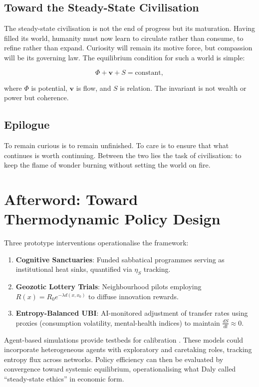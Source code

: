 \documentclass[12pt,a4paper]{article}
\begin{document}
\subsection{Toward the Steady-State Civilisation}

The steady-state civilisation is not the end of progress but its maturation.
Having filled its world, humanity must now learn to circulate rather than consume,
to refine rather than expand.
Curiosity will remain its motive force,
but compassion will be its governing law.
The equilibrium condition for such a world is simple:

\[
\Phi + \mathbf{v} + S = \mathrm{constant},
\]

where $\Phi$ is potential, $\mathbf{v}$ is flow, and $S$ is relation.
The invariant is not wealth or power but coherence.

\subsection*{Epilogue}

To remain curious is to remain unfinished.  
To care is to ensure that what continues is worth continuing.  
Between the two lies the task of civilisation:  
to keep the flame of wonder burning  
without setting the world on fire.

\section*{Afterword: Toward Thermodynamic Policy Design}

Three prototype interventions operationalise the framework:

\begin{enumerate}
\item \textbf{Cognitive Sanctuaries}: Funded sabbatical programmes 
serving as institutional heat sinks, 
quantified via \(\eta_S\) tracking.
\item \textbf{Geozotic Lottery Trials}: Neighbourhood pilots 
employing \(R(x) = R_0 e^{-\lambda d(x,x_0)}\) 
to diffuse innovation rewards.
\item \textbf{Entropy-Balanced UBI}: AI-monitored adjustment 
of transfer rates using proxies 
(consumption volatility, mental-health indices) 
to maintain \(\frac{dS}{dt} \approx 0\).
\end{enumerate}

Agent-based simulations provide testbeds for calibration 
\citep{foster2023agent}. These models could incorporate heterogeneous agents 
with exploratory and caretaking roles, tracking entropy flux across networks. 
Policy efficiency can then be evaluated by convergence toward systemic equilibrium, 
operationalising what Daly called “steady-state ethics” in economic form.
\end{document}
